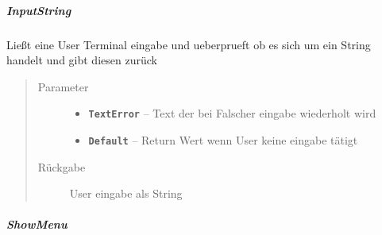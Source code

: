 \documentclass[letterpaper,10pt,ngerman]{sphinxmanual}
\begin{document}
\subparagraph{InputString}
\label{com/linuxluigi/polynomial/TerminalInterface:inputstring}

\begin{fulllineitems}
\label{com/linuxluigi/polynomial/TerminalInterface:com.linuxluigi.polynomial.TerminalInterface.InputString(String, String)}
Ließt eine User Terminal eingabe und ueberprueft ob es sich um ein String handelt und gibt diesen zurück
\begin{quote}\begin{description}
\item[{Parameter}] \leavevmode\begin{itemize}
\item {} 
\textbf{\texttt{TextError}} -- Text der bei Falscher eingabe wiederholt wird

\item {} 
\textbf{\texttt{Default}} -- Return Wert wenn User keine eingabe tätigt

\end{itemize}

\item[{Rückgabe}] \leavevmode
User eingabe als String

\end{description}\end{quote}

\end{fulllineitems}



\subparagraph{ShowMenu}
\label{com/linuxluigi/polynomial/TerminalInterface:showmenu}
\end{document}

